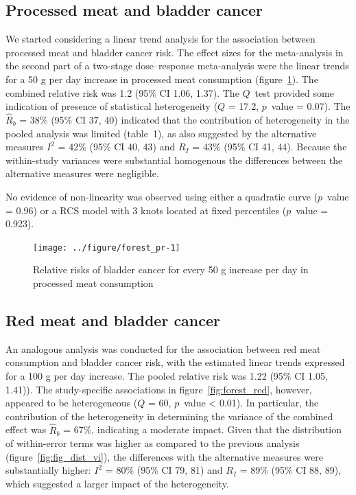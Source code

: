 \documentclass[11pt,a4paper,twoside,openany]{book}\usepackage{knitr}
\begin{document}
{\subsection{Processed meat and bladder cancer}

\noindent We started considering a linear trend analysis for the association between processed meat and bladder cancer risk. The effect sizes for the meta-analysis in the second part of a two-stage dose--response meta-analysis were the linear trends for a 50 g per day increase in processed meat consumption (figure~\ref{fig:forest_pr}). The combined relative risk was 1.2 (95\% CI 1.06, 1.37). The $Q$~test provided some indication of presence of statistical heterogeneity ($Q $ = 17.2, $p$~value = 0.07). The $\hat R_b$ = 38\% (95\% CI 37, 40) indicated that the contribution of heterogeneity in the pooled analysis was limited (table~1), as also suggested by the alternative measures $I^2$ = 42\% (95\% CI 40, 43) and $R_I$ = 43\% (95\% CI 41, 44). Because the within-study variances were substantial homogenous the differences between the alternative measures were negligible. 

\noindent No evidence of non-linearity was observed using either a quadratic curve ($p$~value = 0.96) or a RCS model with 3 knots located at fixed percentiles ($p$~value = 0.923).

\begin{knitrout}\footnotesize
{}\color{fgcolor}\begin{figure}[ht!]

{\centering \texttt{[image: ../figure/forest\_pr-1]} 

}

\caption[Relative risks of bladder cancer for every 50 g increase per day in processed meat consumption]{Relative risks of bladder cancer for every 50 g increase per day in processed meat consumption}\label{fig:forest_pr}
\end{figure}


\end{knitrout}

\subsection{Red meat and bladder cancer}



An analogous analysis was conducted for the association between red meat consumption and bladder cancer risk, with the estimated linear trends expressed for a 100 g per day increase. The pooled relative risk was 1.22 (95\% CI 1.05, 1.41)). The study-specific associations in figure~\ref{fig:forest_red}, however, appeared to be heterogeneous ($Q $ = 60, $p$~value < 0.01). In particular, the contribution of the heterogeneity in determining the variance of the combined effect was $\hat R_b$ = 67\%, indicating a moderate impact. Given that the distribution of within-error terms was higher as compared to the previous analysis (figure~\ref{fig:fig_dist_vi}), the differences with the alternative measures were substantially higher: $I^2$ = 80\% (95\% CI 79, 81) and $R_I$ = 89\% (95\% CI 88, 89), which suggested a larger impact of the heterogeneity. 

}
\end{document}
